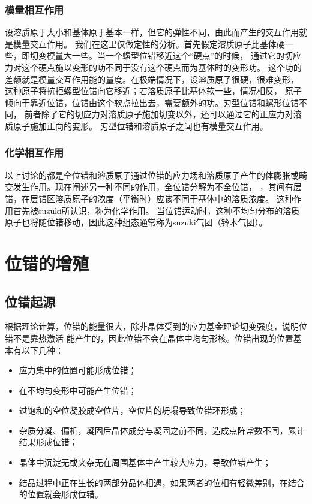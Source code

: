                 \subsubsection{模量相互作用}
                    设溶质原于大小和基体原于基本一样，但它的弹性不同，由此而产生的交互作用就是模量交互作用。
                    我们在这里仅做定性的分析。首先假定溶质原子比基体硬一些，即切变模量大一些。当一个螺型位错移近这个“硬点”的时候，
                    通过它的切应力对这个硬点施以变形的功不同于没有这个硬点而为基体时的变形功。
                    这个功的差额就是模量交互作用能的量度。在极端情况下，设溶质原子很硬，很难变形，
                    这种原子将抗拒螺型位错向它移近；若溶质原子比基体软一些，情况相反，
                    原子倾向于靠近位错，位错由这个软点拉出去，需要额外的功。刃型位错和螺形位错不同，
                    前者除了它的切应力对溶质原子施加切变以外，还可以通过它的正应力对溶质原子施加正向的变形。
                    刃型位错和溶质原子之闻也有模量交互作用。
                \subsubsection{化学相互作用}
                    以上讨论的都是全位错和溶质原子通过位错的应力场和溶质原子产生的体膨胀或畸变发生作用。现在阐述另一种不同的作用，全位错分解为不全位错，
                    ，其间有层错，在层错区溶质原子的浓度（平衡时）应该不同于基体中的溶质浓度。
                    这种作用首先被suzuki所认识，称为化学作用。
                    当位错运动时，这种不均匀分布的溶质原子也将随位错移动，因此这种组态通常称为suzuki气团（铃木气团）。

        \section{位错的增殖}
            \subsection{位错起源}
                根据理论计算，位错的能量很大，除非晶体受到的应力基金理论切变强度，说明位错不是靠热激活
                能产生的，因此位错不会在晶体中均匀形核。位错出现的位置基本有以下几种：
                \begin{itemize}
                    \item 应力集中的位置可能形成位错；
                    \item 在不均匀变形中可能产生位错；
                    \item 过饱和的空位凝胶成空位片，空位片的坍塌导致位错环形成；
                    \item 杂质分凝、偏析，凝固后晶体成分与凝固之前不同，造成点阵常数不同，累计结果形成位错；
                    \item 晶体中沉淀无或夹杂无在周围基体中产生较大应力，导致位错产生；
                    \item 结晶过程中正在生长的两部分晶体相遇，如果两者的位相有轻微差别，在结合的位置就会形成位错。
                \end{itemize}
